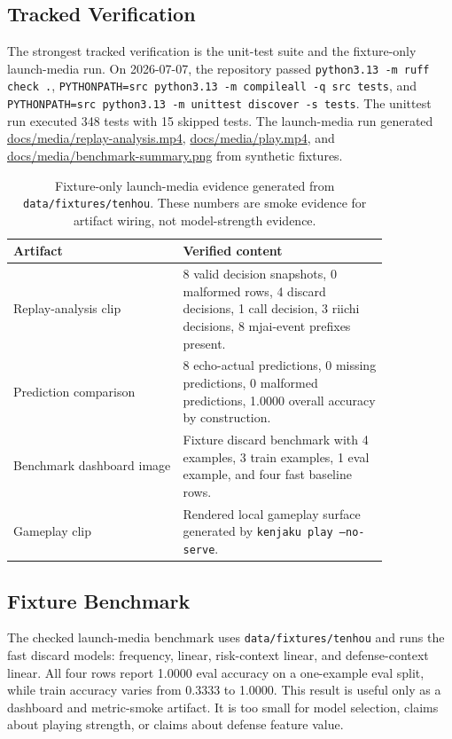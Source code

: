 \documentclass[11pt]{article}
\begin{document}
\subsection{Tracked Verification}

The strongest tracked verification is the unit-test suite and the fixture-only launch-media run.
On 2026-07-07, the repository passed \texttt{python3.13 -m ruff check .},
\texttt{PYTHONPATH=src python3.13 -m compileall -q src tests}, and
\texttt{PYTHONPATH=src python3.13 -m unittest discover -s tests}. The unittest run executed 348
tests with 15 skipped tests. The launch-media run generated
\href{../media/replay-analysis.mp4}{docs/media/replay-analysis.mp4},
\href{../media/play.mp4}{docs/media/play.mp4}, and
\href{../media/benchmark-summary.png}{docs/media/benchmark-summary.png} from synthetic fixtures.

\begin{table}[t]
\centering
\caption{Fixture-only launch-media evidence generated from \texttt{data/fixtures/tenhou}. These
numbers are smoke evidence for artifact wiring, not model-strength evidence.}
\label{tab:launch-evidence}
\begin{tabular}{L{0.38\linewidth}L{0.46\linewidth}}
\toprule
Artifact & Verified content \\
\midrule
Replay-analysis clip & 8 valid decision snapshots, 0 malformed rows, 4 discard decisions, 1 call decision, 3 riichi decisions, 8 mjai-event prefixes present. \\
Prediction comparison & 8 echo-actual predictions, 0 missing predictions, 0 malformed predictions, 1.0000 overall accuracy by construction. \\
Benchmark dashboard image & Fixture discard benchmark with 4 examples, 3 train examples, 1 eval example, and four fast baseline rows. \\
Gameplay clip & Rendered local gameplay surface generated by \texttt{kenjaku play --no-serve}. \\
\bottomrule
\end{tabular}
\end{table}

\subsection{Fixture Benchmark}

The checked launch-media benchmark uses \texttt{data/fixtures/tenhou} and runs the fast discard
models: frequency, linear, risk-context linear, and defense-context linear. All four rows report
1.0000 eval accuracy on a one-example eval split, while train accuracy varies from 0.3333 to
1.0000. This result is useful only as a dashboard and metric-smoke artifact. It is too small for
model selection, claims about playing strength, or claims about defense feature value.
\end{document}
